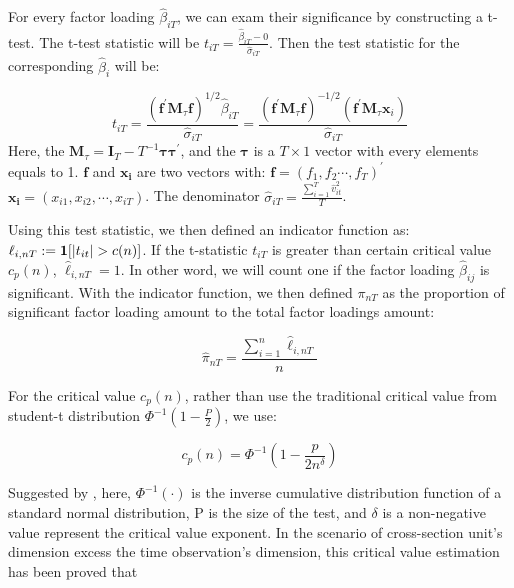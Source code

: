 \documentclass[12pt]{article}
\begin{document}
For every factor loading $\hat{\beta}_{iT}$, we can exam their significance by constructing a t-test.
The t-test statistic will be $t_{iT} = \frac{\hat{\beta}_{iT} - 0}{\hat{\sigma}_{iT}}$.  
Then the test statistic for the corresponding $\hat{\beta}_i$ will be:

\[t_{i T}=\frac{\left(\mathbf{f}^{\prime} \mathbf{M}_{\tau} \mathbf{f}\right)^{1 / 2} \hat{\beta}_{i T}}{\hat{\sigma}_{i T}}=\frac{\left(\mathbf{f}^{\prime} \mathbf{M}_{\tau} \mathbf{f}\right)^{-1 / 2}\left(\mathbf{f}^{\prime} \mathbf{M}_{\tau} \mathbf{x}_{i}\right)}{\hat{\sigma}_{i T}} \tag{3} \label{test_statistic} \]
Here, the $\mathbf{M}_{\tau} = \mathbf{I}_T - T^{-1}\mathbf{\tau}\mathbf{\tau^\prime}$, and the $\mathbf{\tau}$ is a $T\times 1$ vector with every elements equals to 1.
$\mathbf{f}$ and $\mathbf{x_i}$ are two vectors with: $\mathbf{f} = (f_1, f_2 \cdots, f_T)^{\prime}$   $\mathbf{x_i} = (x_{i1}, x_{i2}, \cdots, x_{iT})$.
The denominator $\hat{\sigma}_{iT} = \frac{\sum_{i=1}^{T} \hat{v}^2_{it} }{T}$.

Using this test statistic, we then defined an  indicator function as: $\ell_{i,nT} := {\bf1}[|t_{it}|>c(n)]$.
If the t-statistic $t_{iT}$ is greater than certain critical value $c_p(n)$,  $\hat{\ell}_{i,nT} = 1$. 
In other word, we will count one if the factor loading $\hat{\beta}_{ij}$ is significant. 
With the indicator function, we then defined $\pi_{nT}$ as the proportion of significant factor loading amount to the total factor loadings amount:

\[  \hat{\pi}_{nT} = \frac{\sum_{i=1}^n \hat{\ell}_{i,nT}}{n} \tag{4} \label{pi_function} \]


For the critical value $c_p(n)$, rather than use the traditional critical value from student-t distribution $\Phi^{-1}(1-\frac{P}{2})$, we use:

\[   c_p(n) = \Phi^{-1}(1 - \frac{p}{2n^\delta})   \tag{5} \label{critical_value_function} \]

Suggested by , here, $\Phi^{-1}(\cdot)$ is the inverse cumulative distribution function of a standard normal distribution, P is the size of the test, and $\delta$ is a non-negative value represent the critical value exponent. 
In the scenario of cross-section unit's dimension excess the time observation's dimension, this critical value estimation has been proved that 
\end{document}

